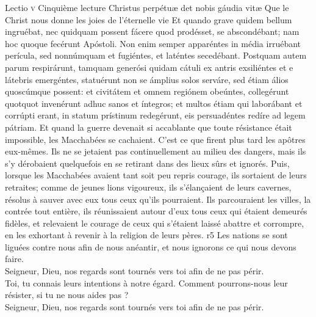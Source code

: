 \documentclass[twoside]{article}
\begin{document}
\begin{paracol}[1]{2}
\lectioresponsorium
	{Lectio \textsc{v}}
	{Cinquième lecture}
	{Christus perpétuæ det nobis gáudia vitæ}
	{Que le Christ nous donne les joies de l'éternelle vie}
	{
		Et quando grave quidem bellum ingruébat, nec quidquam possent fácere quod prodésset, se abscondébant; nam hoc quoque fecérunt Apóstoli. Non enim semper apparéntes in média irruébant perícula, sed nonnúmquam et fugiéntes, et laténtes secedébant. Postquam autem parum respirárunt, tamquam generósi quidam cátuli ex antris exsiliéntes et e látebris emergéntes, statuérunt non se ámplius solos serváre, sed étiam álios quoscúmque possent: et civitátem et omnem regiónem obeúntes, collegérunt quotquot invenérunt adhuc sanos et íntegros; et multos étiam qui laborábant et corrúpti erant, in statum prístinum redegérunt, eis persuadéntes redíre ad legem pátriam.
	}
	{Et quand la guerre devenait si accablante que toute résistance était impossible, les Macchabées se cachaient. C'est ce que firent plus tard les apôtres eux-mêmes. Ils ne se jetaient pas continuellement au milieu des dangers, mais ils s'y dérobaient quelquefois en se retirant dans des lieux sûrs et ignorés. Puis, lorsque les Macchabées avaient tant soit peu repris courage, ils sortaient de leurs retraites; comme de jeunes lions vigoureux, ils s'élançaient de leurs cavernes, résolus à sauver avec eux tous ceux qu'ils pourraient. Ils parcouraient les villes, la contrée tout entière, ils réunissaient autour d'eux tous ceux qui étaient demeurés fidèles, et relevaient le courage de ceux qui s'étaient laissé abattre et corrompre, en les exhortant à revenir à la religion de leurs pères.}
	{r5}
	{\rr Les nations se sont liguées contre nous afin de nous anéantir, et nous ignorons ce qui nous devons faire.\\
	\GreSpecial{*} Seigneur, Dieu, nos regards sont tournés vers toi afin de ne pas périr.\\
	\vv Toi, tu connais leurs intentions à notre égard. Comment pourrons-nous leur résister, si tu ne nous aides pas ?\\
	\GreSpecial{*} Seigneur, Dieu, nos regards sont tournés vers toi afin de ne pas périr.\\}
	

\end{paracol}
\end{document}
